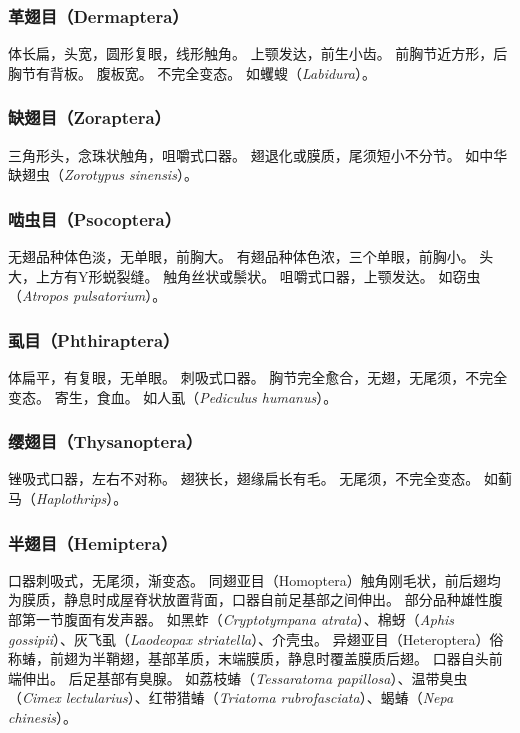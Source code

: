 \documentclass[11pt]{article}
\begin{document}
\subsubsection{革翅目（Dermaptera）}
体长扁，头宽，圆形复眼，线形触角。
上颚发达，前生小齿。
前胸节近方形，后胸节有背板。
腹板宽。
不完全变态。
如蠼螋（\textit{Labidura}）。

\subsubsection{缺翅目（Zoraptera）}
三角形头，念珠状触角，咀嚼式口器。
翅退化或膜质，尾须短小不分节。
如中华缺翅虫（\textit{Zorotypus sinensis}）。

\subsubsection{啮虫目（Psocoptera）}
无翅品种体色淡，无单眼，前胸大。
有翅品种体色浓，三个单眼，前胸小。
头大，上方有Y形蜕裂缝。
触角丝状或鬃状。
咀嚼式口器，上颚发达。
如窃虫（\textit{Atropos pulsatorium}）。

\subsubsection{虱目（Phthiraptera）}
体扁平，有复眼，无单眼。
刺吸式口器。
胸节完全愈合，无翅，无尾须，不完全变态。
寄生，食血。
如人虱（\textit{Pediculus humanus}）。

\subsubsection{缨翅目（Thysanoptera）}
锉吸式口器，左右不对称。
翅狭长，翅缘扁长有毛。
无尾须，不完全变态。
如蓟马（\textit{Haplothrips}）。

\subsubsection{半翅目（Hemiptera）}
口器刺吸式，无尾须，渐变态。
同翅亚目（Homoptera）触角刚毛状，前后翅均为膜质，静息时成屋脊状放置背面，口器自前足基部之间伸出。
部分品种雄性腹部第一节腹面有发声器。
如黑蚱（\textit{Cryptotympana atrata}）、棉蚜（\textit{Aphis gossipii}）、灰飞虱（\textit{Laodeopax striatella}）、介壳虫。
异翅亚目（Heteroptera）俗称蝽，前翅为半鞘翅，基部革质，末端膜质，静息时覆盖膜质后翅。
口器自头前端伸出。
后足基部有臭腺。
如荔枝蝽（\textit{Tessaratoma papillosa}）、温带臭虫（\textit{Cimex lectularius}）、红带猎蝽（\textit{Triatoma rubrofasciata}）、蝎蝽（\textit{Nepa chinesis}）。
\end{document}

